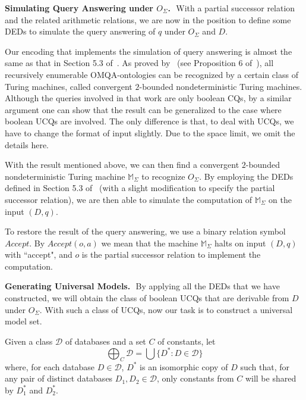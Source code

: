 \documentclass[letterpaper]{article} %
\theoremstyle{definition}
\theoremstyle{remark}
\theoremstyle{definition}
\begin{document}
\medskip
{\noindent\bf Simulating Query Answering under $O_\Sigma$.\,\,} With a partial successor relation and the related arithmetic relations, we are now in the position to define some DEDs to simulate the query answering of $q$ under $O_\Sigma$ and $D$.  

Our encoding that implements the simulation of query answering is almost the same as that in Section 5.3 of~\cite{ZhangZY16}. 
As proved by~\citeauthor{ZhangZY16} (see Proposition 6 of~), all recursively enumerable OMQA-ontologies can be recognized by a certain class of Turing machines, called convergent $2$-bounded nondeterministic Turing machines. Although the queries involved in that work are only boolean CQs, by a similar argument one can show that the result can be generalized to the case where boolean UCQs are involved. The only difference is that, to deal with UCQs, we have to change the format of input slightly. Due to the space limit, we omit the details here.

With the result mentioned above, we can then find a convergent $2$-bounded nondeterministic Turing machine $\mathds{M}_\Sigma$ to recognize $O_\Sigma$. By employing the DEDs defined in Section 5.3 of~\cite{ZhangZY16} (with a slight modification to specify the partial successor relation), we are then able to simulate the computation of $\mathds{M}_\Sigma$ on the input $(D,q)$. 

To restore the result of the query answering, we use a binary relation symbol $\textit{Accept}$. By $\textit{Accept}(o,a)$ we mean that the machine $\mathds{M}_\Sigma$ halts on input $(D,q)$ with ``accept", and $o$ is the partial successor relation to implement the computation.  

\medskip
{\noindent\bf Generating Universal Models.\,\,} By applying all the DEDs that we have constructed, we will obtain the class of boolean UCQs that are derivable from $D$ under $O_\Sigma$. With such a class of UCQs, now our task is to construct a universal model set. 

Given a class $\mathcal{D}$ of databases and a set $C$ of constants, let 
\begin{equation*}
{\bigoplus}_C\mathcal{D}=\bigcup\{D^\ast:D\in\mathcal{D}\}
\end{equation*} where, for each database $D\in\mathcal{D}$, $D^\ast$ is an isomorphic copy of $D$ such that, for any pair of distinct databases $D_1,D_2\in\mathcal{D}$, only constants from $C$ will be shared by $D^\ast_1$ and $D^\ast_2$. 
\end{document}
